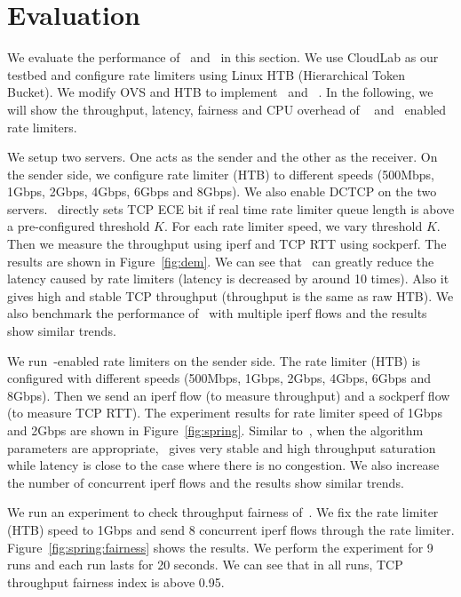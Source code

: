 \section{Evaluation}
\label{rate-limiter:sec:evaluation} 






We evaluate the performance of~\dem{} and~\spring{} in this section. 
We use CloudLab as our testbed and configure rate limiters using Linux HTB 
(Hierarchical Token Bucket). We modify OVS and HTB to implement~\dem{} and ~\spring{}. 
In the following, we will show the throughput, latency, fairness and 
CPU overhead of ~\dem{} and~\spring{} enabled rate limiters.

We setup two servers. One acts as the sender and the other as the receiver. 
On the sender side, we configure rate limiter (HTB) to different speeds 
(500Mbps, 1Gbps, 2Gbps, 4Gbps, 6Gbps and 8Gbps). 
We also enable DCTCP on the two servers.~\dem{} directly sets TCP ECE bit 
if real time rate limiter queue length is above a pre-configured threshold $K$. 
For each rate limiter speed, we vary threshold $K$. 
Then we measure the throughput using iperf and TCP RTT using sockperf. 
The results are shown in Figure~\ref{fig:dem}. 
We can see that~\dem{} can greatly reduce the latency caused by rate limiters (latency is decreased by around 10 times). 
Also it gives high and stable TCP throughput (throughput is the same as raw HTB).
We also benchmark the performance of~\dem{} with multiple iperf flows and the results show similar trends.

We run~\spring{}-enabled rate limiters on the sender side. The rate limiter (HTB) is 
configured with different speeds (500Mbps, 1Gbps, 2Gbps, 4Gbps, 6Gbps and 8Gbps). Then we 
send an iperf flow (to measure throughput) and a sockperf flow (to measure TCP RTT). The 
experiment results for rate limiter speed of 1Gbps and 2Gbps are shown in Figure~\ref{fig:spring}. 
Similar to~\dem{}, when the algorithm parameters are appropriate,~\spring{} gives 
very stable and high throughput saturation while latency is close to the case where there is no congestion. 
We also increase the number of concurrent iperf flows and the results show similar trends.

We run an experiment to check throughput fairness of~\spring{}. We fix the rate limiter (HTB) 
speed to 1Gbps and send 8 concurrent iperf flows through the rate limiter. 
Figure~\ref{fig:spring:fairness} shows the results. We perform the experiment for 9 runs and each run lasts 
for 20 seconds. We can see that in all runs, TCP throughput fairness index is above 0.95.

